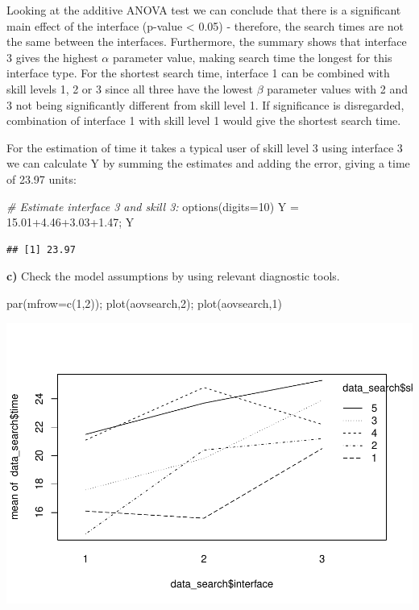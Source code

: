 \documentclass[
  10pt,
]{article}
\newenvironment{Shaded}{\begin{snugshade}}{\end{snugshade}}
\newcommand{\AttributeTok}[1]{\textcolor[rgb]{0.77,0.63,0.00}{#1}}
\newcommand{\CommentTok}[1]{\textcolor[rgb]{0.56,0.35,0.01}{\textit{#1}}}
\newcommand{\DecValTok}[1]{\textcolor[rgb]{0.00,0.00,0.81}{#1}}
\newcommand{\FloatTok}[1]{\textcolor[rgb]{0.00,0.00,0.81}{#1}}
\newcommand{\FunctionTok}[1]{\textcolor[rgb]{0.00,0.00,0.00}{#1}}
\newcommand{\NormalTok}[1]{#1}
\newcommand{\OtherTok}[1]{\textcolor[rgb]{0.56,0.35,0.01}{#1}}
\begin{document}
Looking at the additive ANOVA test we can conclude that there is a
significant main effect of the interface (p-value \textless{} 0.05) -
therefore, the search times are not the same between the interfaces.
Furthermore, the summary shows that interface 3 gives the highest
\(\alpha\) parameter value, making search time the longest for this
interface type. For the shortest search time, interface 1 can be
combined with skill levels 1, 2 or 3 since all three have the lowest
\(\beta\) parameter values with 2 and 3 not being significantly
different from skill level 1. If significance is disregarded,
combination of interface 1 with skill level 1 would give the shortest
search time.

For the estimation of time it takes a typical user of skill level 3
using interface 3 we can calculate Y by summing the estimates and adding
the error, giving a time of 23.97 units:

\begin{Shaded}
\begin{Highlighting}[]
\CommentTok{\# Estimate interface 3 and skill 3:}
\FunctionTok{options}\NormalTok{(}\AttributeTok{digits=}\DecValTok{10}\NormalTok{)}
\NormalTok{Y }\OtherTok{=} \FloatTok{15.01+4.46+3.03+1.47}\NormalTok{; Y}
\end{Highlighting}
\end{Shaded}

\begin{verbatim}
## [1] 23.97
\end{verbatim}

\textbf{c)} Check the model assumptions by using relevant diagnostic
tools.

\begin{Shaded}
\begin{Highlighting}[]
\FunctionTok{par}\NormalTok{(}\AttributeTok{mfrow=}\FunctionTok{c}\NormalTok{(}\DecValTok{1}\NormalTok{,}\DecValTok{2}\NormalTok{)); }\FunctionTok{plot}\NormalTok{(aovsearch,}\DecValTok{2}\NormalTok{); }\FunctionTok{plot}\NormalTok{(aovsearch,}\DecValTok{1}\NormalTok{)}
\end{Highlighting}
\end{Shaded}

\includegraphics{Assignment-2_files/figure-latex/unnamed-chunk-9-1.pdf}
\end{document}
